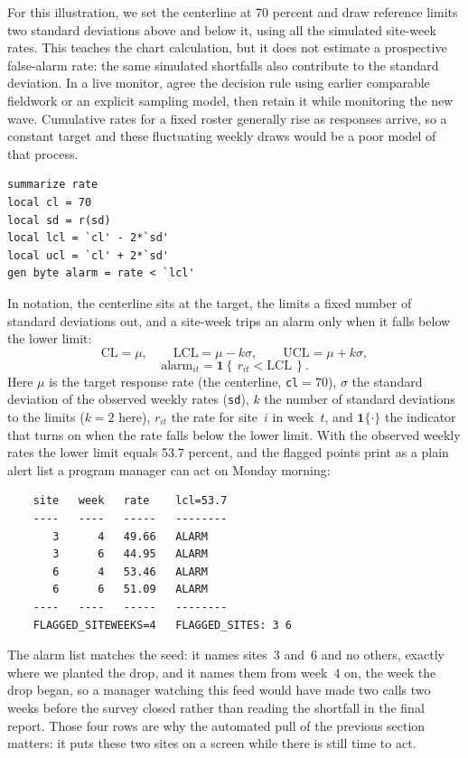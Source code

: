 For this illustration, we set the centerline at 70 percent and draw reference limits two standard deviations above and below it, using all the simulated site-week rates. This teaches the chart calculation, but it does not estimate a prospective false-alarm rate: the same simulated shortfalls also contribute to the standard deviation. In a live monitor, agree the decision rule using earlier comparable fieldwork or an explicit sampling model, then retain it while monitoring the new wave. Cumulative rates for a fixed roster generally rise as responses arrive, so a constant target and these fluctuating weekly draws would be a poor model of that process.
\par
{\footnotesize
\begin{verbatim}
summarize rate
local cl = 70
local sd = r(sd)
local lcl = `cl' - 2*`sd'
local ucl = `cl' + 2*`sd'
gen byte alarm = rate < `lcl'
\end{verbatim}
}
In notation, the centerline sits at the target, the limits a fixed number of standard deviations out, and a site-week trips an alarm only when it falls below the lower limit:
\[
  \text{CL}=\mu,\qquad
  \text{LCL}=\mu-k\sigma,\qquad
  \text{UCL}=\mu+k\sigma,
\]
\[
  \text{alarm}_{it}=\mathbf{1}\!\left\{\,r_{it}<\text{LCL}\,\right\}.
\]
Here $\mu$ is the target response rate (the centerline, \texttt{cl}$=70$), $\sigma$ the standard deviation of the observed weekly rates (\texttt{sd}), $k$ the number of standard deviations to the limits ($k=2$ here), $r_{it}$ the rate for site~$i$ in week~$t$, and $\mathbf{1}\{\cdot\}$ the indicator that turns on when the rate falls below the lower limit. With the observed weekly rates the lower limit equals 53.7 percent, and the flagged points print as a plain alert list a program manager can act on Monday morning:
\par
{\footnotesize
\begin{verbatim}
    site   week   rate    lcl=53.7
    ----   ----   -----   --------
       3      4   49.66   ALARM
       3      6   44.95   ALARM
       6      4   53.46   ALARM
       6      6   51.09   ALARM
    ----   ----   -----   --------
    FLAGGED_SITEWEEKS=4   FLAGGED_SITES: 3 6
\end{verbatim}
}
The alarm list matches the seed: it names sites~3 and~6 and no others, exactly where we planted the drop, and it names them from week~4 on, the week the drop began, so a manager watching this feed would have made two calls two weeks before the survey closed rather than reading the shortfall in the final report. Those four rows are why the automated pull of the previous section matters: it puts these two sites on a screen while there is still time to act.

